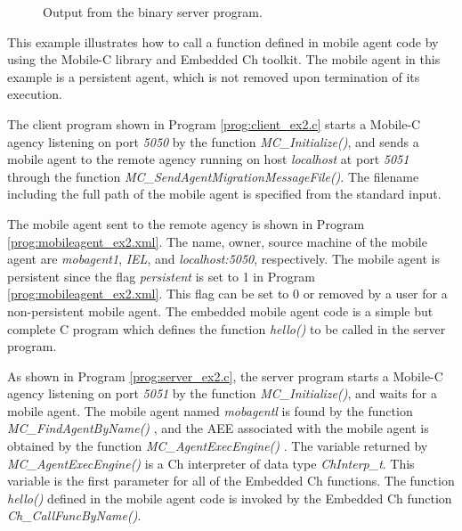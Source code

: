 \documentclass[11pt]{report}
\begin{document}
\begin{figure}[!t]
\begin{center}
   {\footnotesize \linespread{1.0} }
   \caption{Output from the binary server program.}
   \label{fig:example2_output}
\end{center}
\end{figure}

This example illustrates how to call a function defined in mobile agent 
code by using the Mobile-C library and Embedded Ch toolkit. 
The mobile agent in this example is a persistent agent, which is not removed 
upon termination of its execution.

The client program shown in Program \vref{prog:client_ex2.c} starts a Mobile-C 
agency listening on port \textit{5050} by the function 
\textit{MC\_Initialize()}, and sends a mobile agent to the remote agency 
running on host \textit{localhost} at port \textit{5051} through 
the function \textit{MC\_SendAgentMigrationMessageFile()}. 
The filename including the full path of the mobile agent is specified from the 
standard input.

The mobile agent sent to the remote agency is 
shown in Program \vref{prog:mobileagent_ex2.xml}. 
The name, owner, source machine of the mobile agent are 
\textit{mobagent1}, \textit{IEL}, and 
\textit{localhost:5050}, respectively. 
The mobile agent is persistent since the flag \textit{persistent} 
is set to 1 
in Program \ref{prog:mobileagent_ex2.xml}.
This flag can be set to 0 or removed by a user for a non-persistent mobile 
agent.
The embedded mobile agent code is a simple but complete C program which 
defines the function \textit{hello()} to be called in the server program. 

As shown in Program \vref{prog:server_ex2.c}, the server program starts a 
Mobile-C agency listening on port \textit{5051} by the 
function \textit{MC\_Initialize()}, and waits for a mobile agent.  
The mobile agent named \textit{mobagentl} is found by the function 
\textit{MC\_FindAgentByName()} , and the AEE 
associated with the mobile 
agent is obtained by the function \textit{MC\_AgentExecEngine()} 
.
The variable returned by \textit{MC\_AgentExecEngine()} is a Ch interpreter of 
data type \textit{ChInterp\_t}. 
This variable is the first parameter for all of the Embedded Ch functions. 
The function \textit{hello()} defined in the mobile agent code is invoked 
by the Embedded Ch function \textit{Ch\_CallFuncByName()}. 
\end{document}
